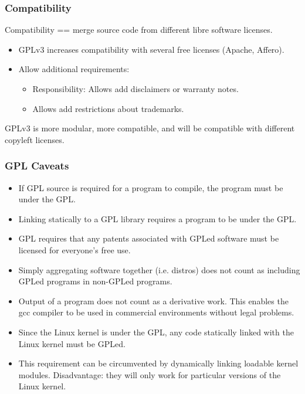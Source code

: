 
\begin{frame}
\frametitle{Compatibility}

Compatibility == merge source code from different libre software licenses.

\begin{itemize}
\item GPLv3 increases compatibility with several free licenses (Apache, Affero).
\item Allow additional requirements:
\begin{itemize}
\item Responsibility: Allows add disclaimers or warranty notes.
\item Allows add restrictions about trademarks.
\end{itemize}
\end{itemize}

GPLv3 is more modular, more compatible, and will be compatible with different copyleft licenses.

\end{frame}


\begin{frame}
\frametitle{GPL Caveats}

\begin{itemize}
\item If GPL source is required for a program to compile, the program must be under the GPL. 
\item Linking statically to a GPL library requires a program to be under the GPL.
\item GPL requires that any patents associated with GPLed software must be licensed for everyone's free use.
\item Simply aggregating software together (i.e. distros) does not count as including GPLed programs in non-GPLed programs.
\item Output of a program does not count as a derivative work. This enables the gcc compiler to be used in commercial environments without legal problems.
\item Since the Linux kernel is under the GPL, any code statically linked with the Linux kernel must be GPLed. 
\item This requirement can be circumvented by dynamically linking loadable kernel modules. Disadvantage: they will only work for particular versions of the Linux kernel.
\end{itemize}

\end{frame}

